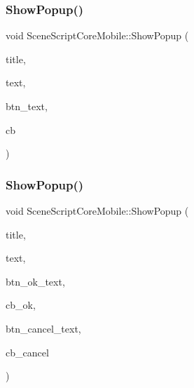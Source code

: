 \hypertarget{class_scene_script_core_mobile_a62cb4343a032f015a7d5adaa4a0a9782}{}\label{class_scene_script_core_mobile_a62cb4343a032f015a7d5adaa4a0a9782} 
\subsubsection{\texorpdfstring{Show\+Popup()}{ShowPopup()}\hspace{0.1cm}{\footnotesize\ttfamily [1/2]}}
{\footnotesize\ttfamily void Scene\+Script\+Core\+Mobile\+::\+Show\+Popup (\begin{DoxyParamCaption}\item[{string \&in}]{title,  }\item[{string \&in}]{text,  }\item[{string \&in}]{btn\+\_\+text,  }\item[{Callback\+W\+OP @}]{cb }\end{DoxyParamCaption})}

\hypertarget{class_scene_script_core_mobile_a00b413238b2760487a2b15bc6523214e}{}\label{class_scene_script_core_mobile_a00b413238b2760487a2b15bc6523214e} 
\subsubsection{\texorpdfstring{Show\+Popup()}{ShowPopup()}\hspace{0.1cm}{\footnotesize\ttfamily [2/2]}}
{\footnotesize\ttfamily void Scene\+Script\+Core\+Mobile\+::\+Show\+Popup (\begin{DoxyParamCaption}\item[{string \&in}]{title,  }\item[{string \&in}]{text,  }\item[{string \&in}]{btn\+\_\+ok\+\_\+text,  }\item[{Callback\+W\+OP @}]{cb\+\_\+ok,  }\item[{string \&in}]{btn\+\_\+cancel\+\_\+text,  }\item[{Callback\+W\+OP @}]{cb\+\_\+cancel }\end{DoxyParamCaption})}

\hypertarget{class_scene_script_core_mobile_aa8c4bc72675c16bac8e46906e55a26c8}{}\label{class_scene_script_core_mobile_aa8c4bc72675c16bac8e46906e55a26c8} 
